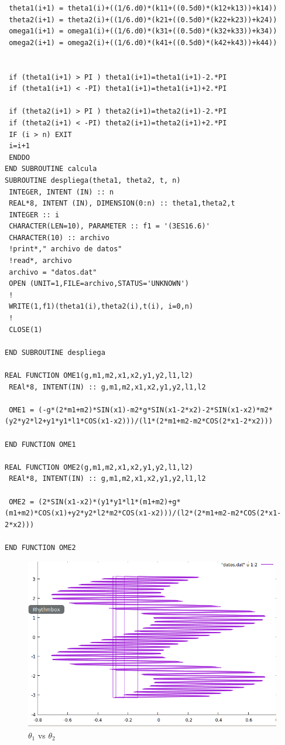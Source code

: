 \documentclass[12pt,a4paper]{article}
\begin{document}
\begin{verbatim}
 theta1(i+1) = theta1(i)+((1/6.d0)*(k11+((0.5d0)*(k12+k13))+k14))
 theta2(i+1) = theta2(i)+((1/6.d0)*(k21+((0.5d0)*(k22+k23))+k24))
 omega1(i+1) = omega1(i)+((1/6.d0)*(k31+((0.5d0)*(k32+k33))+k34))
 omega2(i+1) = omega2(i)+((1/6.d0)*(k41+((0.5d0)*(k42+k43))+k44))
 

 if (theta1(i+1) > PI ) theta1(i+1)=theta1(i+1)-2.*PI
 if (theta1(i+1) < -PI) theta1(i+1)=theta1(i+1)+2.*PI
 
 if (theta2(i+1) > PI ) theta2(i+1)=theta2(i+1)-2.*PI
 if (theta2(i+1) < -PI) theta2(i+1)=theta2(i+1)+2.*PI
 IF (i > n) EXIT
 i=i+1
 ENDDO
END SUBROUTINE calcula
SUBROUTINE despliega(theta1, theta2, t, n)
 INTEGER, INTENT (IN) :: n
 REAL*8, INTENT (IN), DIMENSION(0:n) :: theta1,theta2,t
 INTEGER :: i
 CHARACTER(LEN=10), PARAMETER :: f1 = '(3ES16.6)'
 CHARACTER(10) :: archivo
 !print*," archivo de datos"
 !read*, archivo
 archivo = "datos.dat"
 OPEN (UNIT=1,FILE=archivo,STATUS='UNKNOWN')
 !
 WRITE(1,f1)(theta1(i),theta2(i),t(i), i=0,n)
 !
 CLOSE(1)

END SUBROUTINE despliega

REAL FUNCTION OME1(g,m1,m2,x1,x2,y1,y2,l1,l2)
 REAl*8, INTENT(IN) :: g,m1,m2,x1,x2,y1,y2,l1,l2

 OME1 = (-g*(2*m1+m2)*SIN(x1)-m2*g*SIN(x1-2*x2)-2*SIN(x1-x2)*m2*(y2*y2*l2+y1*y1*l1*COS(x1-x2)))/(l1*(2*m1+m2-m2*COS(2*x1-2*x2)))

END FUNCTION OME1

REAL FUNCTION OME2(g,m1,m2,x1,x2,y1,y2,l1,l2)
 REAl*8, INTENT(IN) :: g,m1,m2,x1,x2,y1,y2,l1,l2

 OME2 = (2*SIN(x1-x2)*(y1*y1*l1*(m1+m2)+g*(m1+m2)*COS(x1)+y2*y2*l2*m2*COS(x1-x2)))/(l2*(2*m1+m2-m2*COS(2*x1-2*x2)))
 
END FUNCTION OME2
\end{verbatim}



\begin{figure}
    \centering
    \includegraphics[scale=0.8]{1.PNG}
    \caption{$\theta_1$ vs $\theta_2$}
\end{figure}
\end{document}
